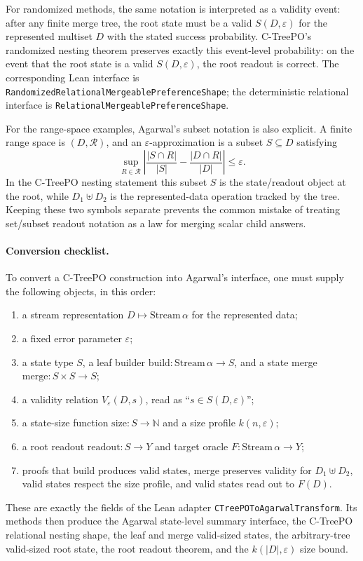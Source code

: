 For randomized methods, the same notation is interpreted as a validity event:
after any finite merge tree, the root state must be a valid
$S(D,\varepsilon)$ for the represented multiset $D$ with the stated success
probability. C-TreePO's randomized nesting theorem preserves exactly this
event-level probability: on the event that the root state is a valid
$S(D,\varepsilon)$, the root readout is correct. The corresponding Lean
interface is \texttt{RandomizedRelationalMergeablePreferenceShape}; the
deterministic relational interface is \texttt{RelationalMergeablePreferenceShape}.

For the range-space examples, Agarwal's subset notation is also explicit. A
finite range space is \((D,\mathcal{R})\), and an
$\varepsilon$-approximation is a subset \(S\subseteq D\) satisfying
\[
\sup_{R\in\mathcal{R}}
\left|
  \frac{|S\cap R|}{|S|}
  -
  \frac{|D\cap R|}{|D|}
\right|
\le \varepsilon .
\]
In the C-TreePO nesting statement this subset \(S\) is the state/readout
object at the root, while \(D_1\uplus D_2\) is the represented-data operation
tracked by the tree. Keeping these two symbols separate prevents the common
mistake of treating set/subset readout notation as a law for merging scalar
child answers.

\paragraph{Conversion checklist.}
To convert a C-TreePO construction into Agarwal's interface, one must supply
the following objects, in this order:
\begin{enumerate}
\item a stream representation \(D\mapsto \mathrm{Stream}\,\alpha\) for the
represented data;
\item a fixed error parameter \(\varepsilon\);
\item a state type \(S\), a leaf builder
\(\mathrm{build}:\mathrm{Stream}\,\alpha\to S\), and a state merge
\(\mathrm{merge}:S\times S\to S\);
\item a validity relation \(V_\varepsilon(D,s)\), read as
``\(s\in S(D,\varepsilon)\)'';
\item a state-size function \(\mathrm{size}:S\to\mathbb{N}\) and a size profile
\(k(n,\varepsilon)\);
\item a root readout \(\mathrm{readout}:S\to Y\) and target oracle
\(F:\mathrm{Stream}\,\alpha\to Y\);
\item proofs that build produces valid states, merge preserves validity for
\(D_1\uplus D_2\), valid states respect the size profile, and valid states read
out to \(F(D)\).
\end{enumerate}
These are exactly the fields of the Lean adapter
\texttt{CTreePOToAgarwalTransform}. Its methods then produce the Agarwal
state-level summary interface, the C-TreePO relational nesting shape, the
leaf and merge valid-sized states, the arbitrary-tree valid-sized root state,
the root readout theorem, and the \(k(|D|,\varepsilon)\) size bound.

